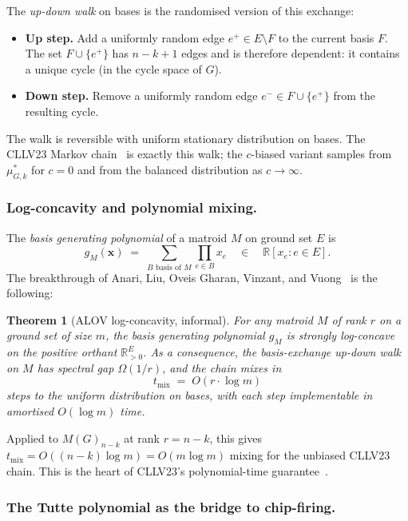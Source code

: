 \documentclass[11pt]{article}
\newtheorem{theorem}{Theorem}[section]
\newcommand{\R}{\mathbb{R}}
\begin{document}
The \emph{up-down walk} on bases is the randomised version of this
exchange:
\begin{itemize}
  \item \textbf{Up step.} Add a uniformly random edge
    $e^+ \in E \setminus F$ to the current basis $F$. The set
    $F \cup \{e^+\}$ has $n-k+1$ edges and is therefore dependent: it
    contains a unique cycle (in the cycle space of $G$).
  \item \textbf{Down step.} Remove a uniformly random edge
    $e^- \in F \cup \{e^+\}$ from the resulting cycle.
\end{itemize}
The walk is reversible with uniform stationary distribution on bases.
The CLLV23 Markov chain~\cite[Definition~18]{charikar2023complexity} is
exactly this walk; the $c$-biased variant samples from $\mu^*_{G,k}$ for
$c = 0$ and from the balanced distribution as $c \to \infty$.

\subsubsection*{Log-concavity and polynomial mixing.}

The \emph{basis generating polynomial} of a matroid $M$ on ground set
$E$ is
\[
  g_M(\mathbf{x}) \;=\; \sum_{B \text{ basis of } M} \prod_{e \in B} x_e
  \quad \in \quad \R[x_e : e \in E].
\]
The breakthrough of Anari, Liu, Oveis Gharan, Vinzant, and
Vuong~\cite{anari2021logconcave} is the following:

\begin{theorem}[ALOV log-concavity, informal]\label{thm:alov}
For any matroid $M$ of rank $r$ on a ground set of size $m$, the basis
generating polynomial $g_M$ is \emph{strongly log-concave} on the
positive orthant $\R_{>0}^E$. As a consequence, the basis-exchange
up-down walk on $M$ has spectral gap $\Omega(1/r)$, and the chain mixes
in
\[
  t_{\mathrm{mix}} \;=\; O(r \cdot \log m)
\]
steps to the uniform distribution on bases, with each step implementable
in amortised $O(\log m)$ time.
\end{theorem}

\noindent Applied to $M(G)_{n-k}$ at rank $r = n-k$, this gives
$t_{\mathrm{mix}} = O((n-k)\log m) = O(m \log m)$ mixing for the
unbiased CLLV23 chain. This is the heart of CLLV23's polynomial-time
guarantee~\cite[Theorem~19]{charikar2023complexity}.

\subsubsection*{The Tutte polynomial as the bridge to chip-firing.}
\end{document}
